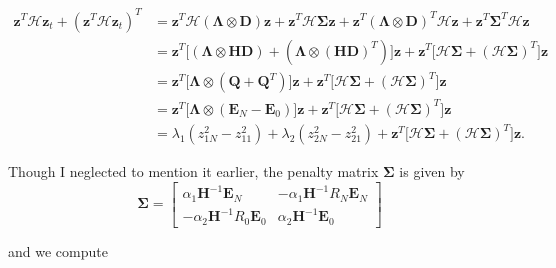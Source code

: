 \documentclass[12pt]{article}
\begin{document}
\begin{flushleft}
\begin{align*}
\mathbf{z}^{T} \mathcal{H} \mathbf{z}_t + (\mathbf{z}^{T}\mathcal{H} \mathbf{z}_t)^{T} &= \mathbf{z}^{T}\mathcal{H} (\boldsymbol{\Lambda} \otimes \boldsymbol{D} ) \mathbf{z} + \mathbf{z}^{T} \mathcal{H} \boldsymbol{\Sigma} \boldsymbol{z} 
+ \mathbf{z}^{T} (\boldsymbol{\Lambda} \otimes \boldsymbol{D} )^{T}\mathcal{H} \mathbf{z} + \mathbf{z}^{T} \boldsymbol{\Sigma}^{T}\mathcal{H} \boldsymbol{z}\\
&=\mathbf{z}^{T} \big [( \boldsymbol{\Lambda} \otimes \boldsymbol{H D}) + (\boldsymbol{\Lambda} \otimes (\boldsymbol{HD})^{T}) \big ] \mathbf{z} + \mathbf{z}^{T} \big [ \mathcal{H}\boldsymbol{\Sigma} +(\mathcal{H}\boldsymbol{\Sigma})^{T} \big ] \mathbf{z}\\
&= \mathbf{z}^{T} \big [ \boldsymbol{\Lambda} \otimes (\boldsymbol{Q} +\boldsymbol{Q}^{T}) \big ] \mathbf{z} + \mathbf{z}^{T} \big [ \mathcal{H}\boldsymbol{\Sigma} +(\mathcal{H}\boldsymbol{\Sigma})^{T} \big ] \mathbf{z}\\
&= \mathbf{z}^{T} \big [ \boldsymbol{\Lambda} \otimes (\boldsymbol{E}_N - \boldsymbol{E}_0) \big ] \mathbf{z} + \mathbf{z}^{T} \big [ \mathcal{H}\boldsymbol{\Sigma} +(\mathcal{H}\boldsymbol{\Sigma})^{T} \big ] \mathbf{z} \\
&= \lambda_1( z_{1N}^2 - z_{11}^2) + \lambda_2(z_{2N}^2 - z_{21}^2) + \mathbf{z}^{T} \big [ \mathcal{H}\boldsymbol{\Sigma} +(\mathcal{H}\boldsymbol{\Sigma})^{T} \big ] \mathbf{z}.
\end{align*}

Though I neglected to mention it earlier, the penalty matrix $\boldsymbol{\Sigma}$ is given by 
$$\boldsymbol{\Sigma} = \begin{bmatrix}
\alpha_1 \boldsymbol{H}^{-1} \boldsymbol{E}_N & -\alpha_1 \boldsymbol{H}^{-1} R_N \boldsymbol{E}_N \\
-\alpha_2 \boldsymbol{H}^{-1} R_0 \boldsymbol{E}_0 & \alpha_2\boldsymbol{H}^{-1} \boldsymbol{E}_0
\end{bmatrix}$$

and we compute


\end{flushleft}
\end{document}
